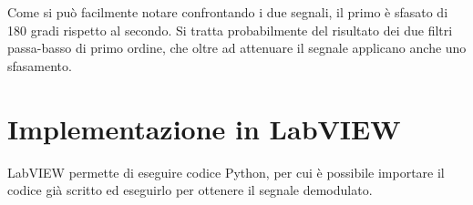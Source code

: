 \documentclass{article}
\begin{document}
\vspace{2cm}
Come si può facilmente notare confrontando i due segnali, il primo è sfasato di 180 gradi rispetto al secondo.
Si tratta probabilmente del risultato dei due filtri passa-basso di primo ordine, che oltre ad attenuare il segnale
applicano anche uno sfasamento.

\section{Implementazione in LabVIEW}
LabVIEW permette di eseguire codice Python, per cui è possibile importare il codice già scritto ed eseguirlo per ottenere
il segnale demodulato.
\end{document}
